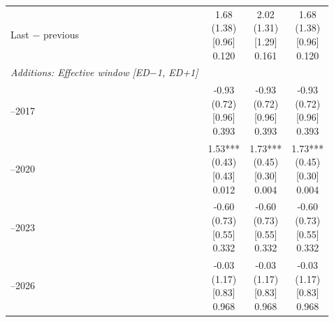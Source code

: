 \begin{threeparttable}
\begin{tabular}{@{}lccc}
\addlinespace[0.25ex]
\addlinespace[0.25ex]
Last $-$ previous & \makecell{1.68\\(1.38)\\{}[0.96]\\{0.120}} & \makecell{2.02\\(1.31)\\{}[1.29]\\{0.161}} & \makecell{1.68\\(1.38)\\{}[0.96]\\{0.120}} \\
\addlinespace[0.25ex]
\midrule
\emph{Additions: Effective window [ED$-$1, ED+1]} \\
\addlinespace[0.25ex]
\addlinespace[1ex]
2013–2017 & \makecell{-0.93\\(0.72)\\{}[0.96]\\{0.393}} & \makecell{-0.93\\(0.72)\\{}[0.96]\\{0.393}} & \makecell{-0.93\\(0.72)\\{}[0.96]\\{0.393}} \\
\addlinespace[0.25ex]
\addlinespace[0.25ex]
2018–2020 & \makecell{1.53***\\(0.43)\\{}[0.43]\\{0.012}} & \makecell{1.73***\\(0.45)\\{}[0.30]\\{0.004}} & \makecell{1.73***\\(0.45)\\{}[0.30]\\{0.004}} \\
\addlinespace[0.25ex]
\addlinespace[0.25ex]
2021–2023 & \makecell{-0.60\\(0.73)\\{}[0.55]\\{0.332}} & \makecell{-0.60\\(0.73)\\{}[0.55]\\{0.332}} & \makecell{-0.60\\(0.73)\\{}[0.55]\\{0.332}} \\
\addlinespace[0.25ex]
\addlinespace[0.25ex]
2024–2026 & \makecell{-0.03\\(1.17)\\{}[0.83]\\{0.968}} & \makecell{-0.03\\(1.17)\\{}[0.83]\\{0.968}} & \makecell{-0.03\\(1.17)\\{}[0.83]\\{0.968}} \\

\end{tabular}
\end{threeparttable}
